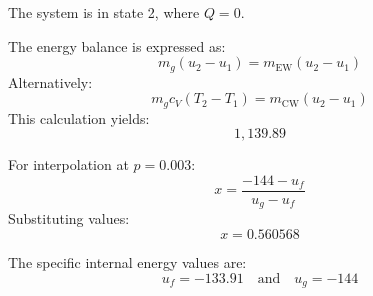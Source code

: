 The system is in state 2, where \( Q = 0 \).  

The energy balance is expressed as:  
\[
m_g (u_2 - u_1) = m_{\text{EW}} (u_2 - u_1)
\]  
Alternatively:  
\[
m_g c_V (T_2 - T_1) = m_{\text{CW}} (u_2 - u_1)
\]  
This calculation yields:  
\[
1,139.89
\]  

For interpolation at \( p = 0.003 \):  
\[
x = \frac{-144 - u_f}{u_g - u_f}
\]  
Substituting values:  
\[
x = 0.560568
\]  

The specific internal energy values are:  
\[
u_f = -133.91 \quad \text{and} \quad u_g = -144
\]